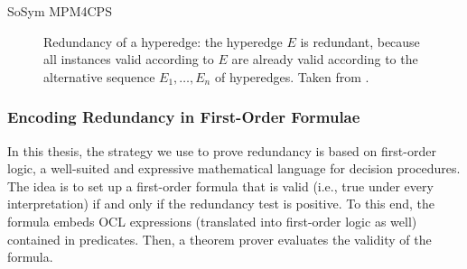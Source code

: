 \begin{copiedFrom}{SoSym MPM4CPS}
\begin{figure}
    \centering
    
    \caption[Redundancy of a hyperedge]{Redundancy of a hyperedge: the hyperedge $E$ is redundant, because all instances valid according to $E$ are already valid according to the alternative sequence $E_1, \dots, E_n$ of hyperedges. Taken from .}
    \label{fig:compatibility:comparison_validinstances}
\end{figure}

\subsubsection{Encoding Redundancy in First-Order Formulae}

In this thesis, the strategy we use to prove redundancy is based on first-order logic, a well-suited and expressive mathematical language for decision procedures. The idea is to set up a first-order formula that is valid (i.e., true under every interpretation) if and only if the redundancy test is positive. To this end, the formula embeds OCL expressions (translated into first-order logic as well) contained in predicates. Then, a theorem prover evaluates the validity of the formula. 


\end{copiedFrom}
